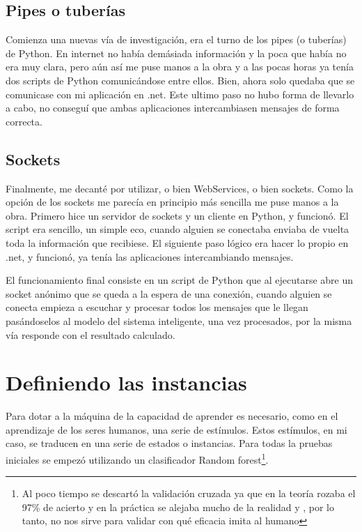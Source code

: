 \subsection{Pipes o tuberías}
Comienza una nuevas vía de investigación, era el turno de los pipes (o tuberías) de Python. En internet no había demásiada información y la poca que había no era muy clara, pero aún así me puse manos a la obra y a las pocas horas ya tenía dos scripts de Python comunicándose entre ellos. Bien, ahora solo quedaba que se comunicase con mi aplicación en .net. Este ultimo paso no hubo forma de llevarlo a cabo, no conseguí que ambas aplicaciones intercambiasen mensajes de forma correcta.

\subsection{Sockets}
Finalmente, me decanté por utilizar, o bien WebServices, o bien sockets. Como la opción de los sockets me parecía en principio más sencilla me puse manos a la obra. Primero hice un servidor de sockets y un cliente en Python, y funcionó. El script era sencillo, un simple eco, cuando alguien se conectaba enviaba de vuelta toda la información que recibiese. El siguiente paso lógico era hacer lo propio en .net, y funcionó, ya tenía las aplicaciones intercambiando mensajes.

El funcionamiento final consiste en un script de Python que al ejecutarse abre un socket anónimo que se queda a la espera de una conexión, cuando alguien se conecta empieza a escuchar y procesar todos los mensajes que le llegan pasándoselos al modelo del sistema inteligente, una vez procesados, por la misma vía responde con el resultado calculado.


\section{Definiendo las instancias}

Para dotar a la máquina de la capacidad de aprender es necesario, como en el aprendizaje de los seres humanos, una serie de estímulos. Estos estímulos, en mi caso, se traducen en una serie de estados o instancias. Para todas la pruebas iniciales se empezó utilizando un clasificador Random forest\footnote{Al poco tiempo se descartó la validación cruzada ya que en la teoría rozaba el 97\% de acierto y en la práctica se alejaba mucho de la realidad y , por lo tanto, no nos sirve para validar con qué eficacia imita al humano}.

